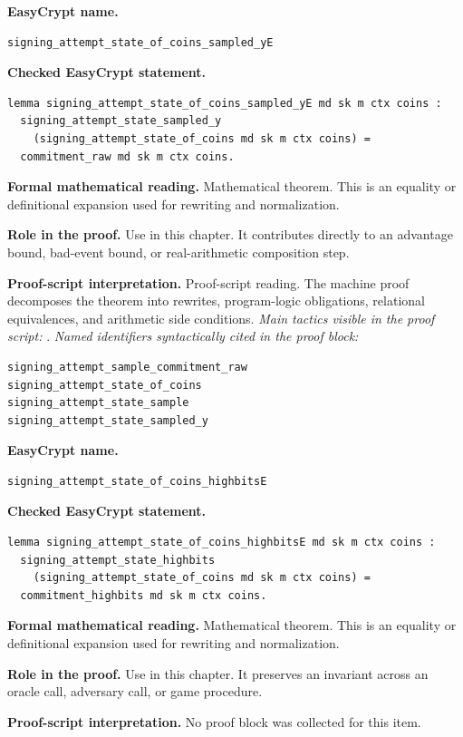 \begin{formaltheorem}
\noindent\textbf{EasyCrypt name.}
\begin{lstlisting}[language=EasyCrypt,basicstyle=\ttfamily\scriptsize]
signing_attempt_state_of_coins_sampled_yE
\end{lstlisting}
\noindent\textbf{Checked EasyCrypt statement.}
\begin{lstlisting}[language=EasyCrypt,basicstyle=\ttfamily\scriptsize]
lemma signing_attempt_state_of_coins_sampled_yE md sk m ctx coins :
  signing_attempt_state_sampled_y
    (signing_attempt_state_of_coins md sk m ctx coins) =
  commitment_raw md sk m ctx coins.
\end{lstlisting}
\noindent\textbf{Formal mathematical reading.}
Mathematical theorem. This is an equality or definitional expansion used for rewriting and normalization.

\noindent\textbf{Role in the proof.}
Use in this chapter. It contributes directly to an advantage bound, bad-event bound, or real-arithmetic composition step.

\noindent\textbf{Proof-script interpretation.}
Proof-script reading. The machine proof decomposes the theorem into rewrites, program-logic obligations, relational equivalences, and arithmetic side conditions.
\emph{Main tactics visible in the proof script:} .
\emph{Named identifiers syntactically cited in the proof block:}
\begin{lstlisting}[language=EasyCrypt,basicstyle=\ttfamily\scriptsize]
signing_attempt_sample_commitment_raw
signing_attempt_state_of_coins
signing_attempt_state_sample
signing_attempt_state_sampled_y
\end{lstlisting}

\end{formaltheorem}

\begin{formaltheorem}
\noindent\textbf{EasyCrypt name.}
\begin{lstlisting}[language=EasyCrypt,basicstyle=\ttfamily\scriptsize]
signing_attempt_state_of_coins_highbitsE
\end{lstlisting}
\noindent\textbf{Checked EasyCrypt statement.}
\begin{lstlisting}[language=EasyCrypt,basicstyle=\ttfamily\scriptsize]
lemma signing_attempt_state_of_coins_highbitsE md sk m ctx coins :
  signing_attempt_state_highbits
    (signing_attempt_state_of_coins md sk m ctx coins) =
  commitment_highbits md sk m ctx coins.
\end{lstlisting}
\noindent\textbf{Formal mathematical reading.}
Mathematical theorem. This is an equality or definitional expansion used for rewriting and normalization.

\noindent\textbf{Role in the proof.}
Use in this chapter. It preserves an invariant across an oracle call, adversary call, or game procedure.

\noindent\textbf{Proof-script interpretation.}
No proof block was collected for this item.

\end{formaltheorem}

